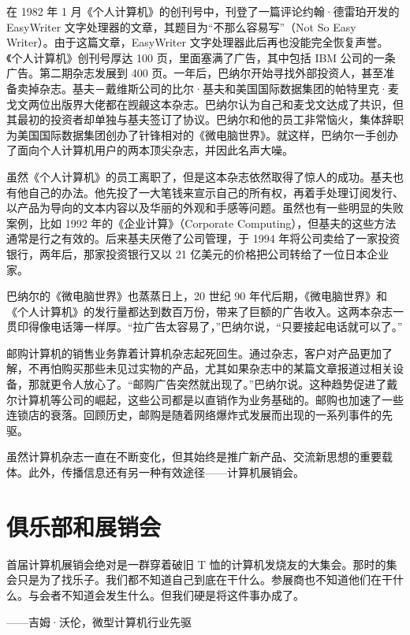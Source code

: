 \documentclass[12pt,UTF8]{ctexbook}
\begin{document}
在 1982 年 1 月《个人计算机》的创刊号中，刊登了一篇评论约翰·德雷珀开发的 EasyWriter 文字处理器的文章，其题目为“不那么容易写”（Not So Easy Writer）。由于这篇文章，EasyWriter 文字处理器此后再也没能完全恢复声誉。《个人计算机》创刊号厚达 100 页，里面塞满了广告，其中包括 IBM 公司的一条广告。第二期杂志发展到 400 页。一年后，巴纳尔开始寻找外部投资人，甚至准备卖掉杂志。基夫－戴维斯公司的比尔·基夫和美国国际数据集团的帕特里克·麦戈文两位出版界大佬都在觊觎这本杂志。巴纳尔认为自己和麦戈文达成了共识，但其最初的投资者却单独与基夫签订了协议。巴纳尔和他的员工非常恼火，集体辞职为美国国际数据集团创办了针锋相对的《微电脑世界》。就这样，巴纳尔一手创办了面向个人计算机用户的两本顶尖杂志，并因此名声大噪。

虽然《个人计算机》的员工离职了，但是这本杂志依然取得了惊人的成功。基夫也有他自己的办法。他先投了一大笔钱来宣示自己的所有权，再着手处理订阅发行、以产品为导向的文本内容以及华丽的外观和手感等问题。虽然也有一些明显的失败案例，比如 1992 年的《企业计算》（Corporate Computing），但基夫的这些方法通常是行之有效的。后来基夫厌倦了公司管理，于 1994 年将公司卖给了一家投资银行，两年后，那家投资银行又以 21 亿美元的价格把公司转给了一位日本企业家。

巴纳尔的《微电脑世界》也蒸蒸日上，20 世纪 90 年代后期，《微电脑世界》和《个人计算机》的发行量都达到数百万份，带来了巨额的广告收入。这两本杂志一贯印得像电话簿一样厚。“拉广告太容易了，”巴纳尔说，“只要接起电话就可以了。”

邮购计算机的销售业务靠着计算机杂志起死回生。通过杂志，客户对产品更加了解，不再怕购买那些未见过实物的产品，尤其如果杂志中的某篇文章报道过相关设备，那就更令人放心了。“邮购广告突然就出现了。”巴纳尔说。这种趋势促进了戴尔计算机等公司的崛起，这些公司都是以直销作为业务基础的。邮购也加速了一些连锁店的衰落。回顾历史，邮购是随着网络爆炸式发展而出现的一系列事件的先驱。

虽然计算机杂志一直在不断变化，但其始终是推广新产品、交流新思想的重要载体。此外，传播信息还有另一种有效途径——计算机展销会。





\section{俱乐部和展销会}


首届计算机展销会绝对是一群穿着破旧 T 恤的计算机发烧友的大集会。那时的集会只是为了找乐子。我们都不知道自己到底在干什么。参展商也不知道他们在干什么。与会者不知道会发生什么。但我们硬是将这件事办成了。

——吉姆·沃伦，微型计算机行业先驱
\end{document}
